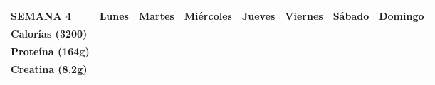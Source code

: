 \documentclass[10pt, a4paper]{article}
\begin{document}
\vspace{0.8cm}

\begin{tabularx}{\textwidth}{|l|X|X|X|X|X|X|X|}
\hline
\rowcolor{gray!20}
\textbf{SEMANA 4} & \textbf{Lunes} & \textbf{Martes} & \textbf{Miércoles} & \textbf{Jueves} & \textbf{Viernes} & \textbf{Sábado} & \textbf{Domingo} \\ \hline
\textbf{Calorías (3200)} & & & & & & & \\ \hline
\textbf{Proteína (164g)} & & & & & & & \\ \hline
\textbf{Creatina (8.2g)} & & & & & & & \\ \hline
\end{tabularx}
\end{document}
